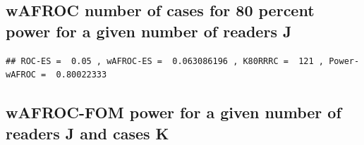 \documentclass[
]{book}
\newenvironment{Shaded}{\begin{snugshade}}{\end{snugshade}}
\newcommand{\AttributeTok}[1]{\textcolor[rgb]{0.77,0.63,0.00}{#1}}
\newcommand{\ConstantTok}[1]{\textcolor[rgb]{0.00,0.00,0.00}{#1}}
\newcommand{\DecValTok}[1]{\textcolor[rgb]{0.00,0.00,0.81}{#1}}
\newcommand{\FunctionTok}[1]{\textcolor[rgb]{0.00,0.00,0.00}{#1}}
\newcommand{\NormalTok}[1]{#1}
\newcommand{\OtherTok}[1]{\textcolor[rgb]{0.56,0.35,0.01}{#1}}
\newcommand{\SpecialCharTok}[1]{\textcolor[rgb]{0.00,0.00,0.00}{#1}}
\newcommand{\StringTok}[1]{\textcolor[rgb]{0.31,0.60,0.02}{#1}}
\begin{document}
\hypertarget{wafroc-number-of-cases-for-80-percent-power-for-a-given-number-of-readers-j}{%
\subsection{wAFROC number of cases for 80 percent power for a given number of readers J}\label{wafroc-number-of-cases-for-80-percent-power-for-a-given-number-of-readers-j}}

\begin{Shaded}
\end{Shaded}

\begin{verbatim}
## ROC-ES =  0.05 , wAFROC-ES =  0.063086196 , K80RRRC =  121 , Power-wAFROC =  0.80022333
\end{verbatim}

\hypertarget{wafroc-fom-power-for-a-given-number-of-readers-j-and-cases-k}{%
\subsection{wAFROC-FOM power for a given number of readers J and cases K}\label{wafroc-fom-power-for-a-given-number-of-readers-j-and-cases-k}}
\end{document}
